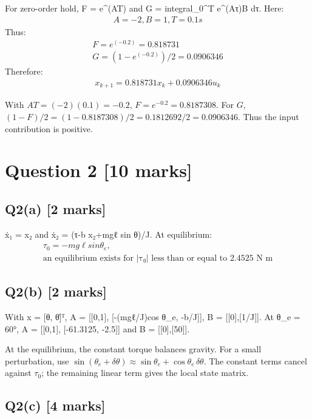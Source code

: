 \documentclass[11pt,a4paper]{article}
\begin{document}
For zero-order hold, F = e\textasciicircum{}(AT) and G = integral\_0\textasciicircum{}T e\textasciicircum{}(Aτ)B dτ.
Here:\[\begin{aligned}A = -2, B = 1, T = 0.1 s\end{aligned}\]
Thus:\[\begin{aligned}F = e^(-0.2) = 0.818731\\ G = (1-e^(-0.2))/2 = 0.0906346\end{aligned}\]
Therefore:\[\begin{aligned}x_{k+1} = 0.818731 x_k + 0.0906346 u_k\end{aligned}\]\par\smallskip With $AT=(-2)(0.1)=-0.2$, $F=e^{-0.2}=0.8187308$. For $G$, $(1-F)/2=(1-0.8187308)/2=0.1812692/2=0.0906346$. Thus the input contribution is positive.

\section*{Question 2 \hfill [10 marks]}
\subsection*{Q2(a) \hfill [2 marks]}

ẋ₁ = x₂ and ẋ₂ = (τ-b x₂+mgℓ sin θ)/J.
At equilibrium:\[\begin{aligned}τ_0 = -mg\ell sin \theta_e,\\ \text{an equilibrium exists for |τ₀| less than or equal to 2.4525 N m}\end{aligned}\]

\subsection*{Q2(b) \hfill [2 marks]}

With x = [θ, θ̇]ᵀ, A = [[0,1], [-(mgℓ/J)cos θ\_e, -b/J]], B = [[0],[1/J]].
At θ\_e = 60°, A = [[0,1], [-61.3125, -2.5]] and B = [[0],[50]].\par\smallskip At the equilibrium, the constant torque balances gravity. For a small perturbation, use $\sin(\theta_e+\delta\theta)\approx\sin\theta_e+\cos\theta_e\,\delta\theta$. The constant terms cancel against $\tau_0$; the remaining linear term gives the local state matrix.

\subsection*{Q2(c) \hfill [4 marks]}
\end{document}
